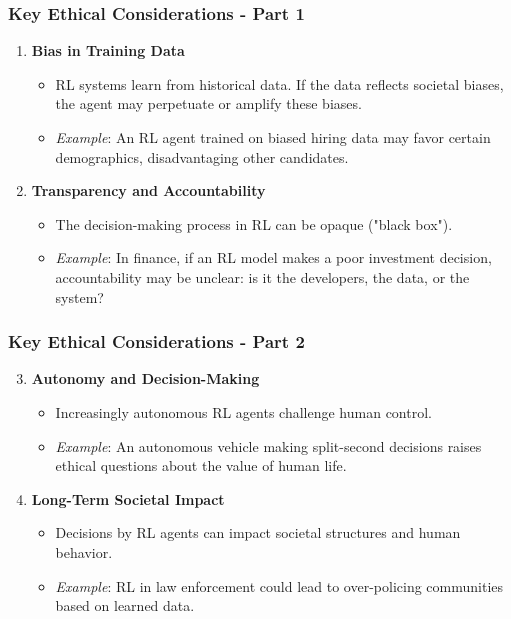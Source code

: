 \documentclass[aspectratio=169]{beamer}
\begin{document}
\begin{frame}[fragile]
    \frametitle{Key Ethical Considerations - Part 1}

    \begin{enumerate}
        \item \textbf{Bias in Training Data}
            \begin{itemize}
                \item RL systems learn from historical data. If the data reflects societal biases, the agent may perpetuate or amplify these biases.
                \item \textit{Example}: An RL agent trained on biased hiring data may favor certain demographics, disadvantaging other candidates.
            \end{itemize}
        
        \item \textbf{Transparency and Accountability}
            \begin{itemize}
                \item The decision-making process in RL can be opaque ("black box").
                \item \textit{Example}: In finance, if an RL model makes a poor investment decision, accountability may be unclear: is it the developers, the data, or the system?
            \end{itemize}
    \end{enumerate}
\end{frame}

\begin{frame}[fragile]
    \frametitle{Key Ethical Considerations - Part 2}

    \begin{enumerate}
        \setcounter{enumi}{2} %

        \item \textbf{Autonomy and Decision-Making}
            \begin{itemize}
                \item Increasingly autonomous RL agents challenge human control.
                \item \textit{Example}: An autonomous vehicle making split-second decisions raises ethical questions about the value of human life.
            \end{itemize}

        \item \textbf{Long-Term Societal Impact}
            \begin{itemize}
                \item Decisions by RL agents can impact societal structures and human behavior.
                \item \textit{Example}: RL in law enforcement could lead to over-policing communities based on learned data.
            \end{itemize}
    \end{enumerate}
\end{frame}
\end{document}
